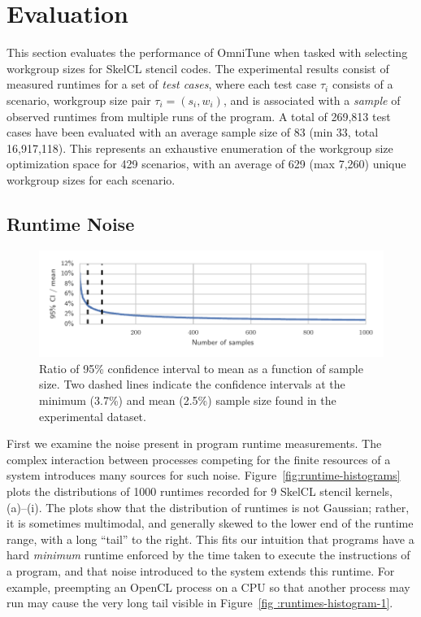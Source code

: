 \documentclass[nonatbib,preprint,nocopyrightspace,9pt]{sigplanconf}
\begin{document}
  \section{Evaluation}\label{sec:evaluation}

  This section evaluates the performance of OmniTune when tasked with selecting
  workgroup sizes for SkelCL stencil codes. The experimental results consist of
  measured runtimes for a set of \emph{test cases}, where each test case $\tau_i$
  consists of a scenario, workgroup size pair $\tau_i = (s_i,w_i)$, and is
  associated with a \emph{sample} of observed runtimes from multiple runs of the
  program. A total of 269,813 test cases have been evaluated with an average
  sample size of 83 (min 33, total 16,917,118). This represents an exhaustive
  enumeration of the workgroup size optimization space for 429 scenarios, with an
  average of 629 (max 7,260) unique workgroup sizes for each scenario.


  \subsection{Runtime Noise}

  \begin{figure}
    \centering
    \includegraphics[width=\columnwidth]{img/ci_trend}
    \caption{%
    Ratio of 95\% confidence interval to mean as a function of sample size. Two
    dashed lines indicate the confidence intervals at the minimum (3.7\%) and mean
    (2.5\%) sample size found in the experimental dataset.%
    }
    \label{fig:ci-trends}
  \end{figure}

  First we examine the noise present in program runtime measurements. The complex
  interaction between processes competing for the finite resources of a system
  introduces many sources for such noise. Figure~\ref{fig:runtime-histograms}
  plots the distributions of 1000 runtimes recorded for 9 SkelCL stencil kernels,
  (a)--(i). The plots show that the distribution of runtimes is not Gaussian;
  rather, it is sometimes multimodal, and generally skewed to the lower end of the
  runtime range, with a long ``tail'' to the right. This fits our intuition that
  programs have a hard \emph{minimum} runtime enforced by the time taken to
  execute the instructions of a program, and that noise introduced to the system
  extends this runtime. For example, preempting an OpenCL process on a CPU so that
  another process may run may cause the very long tail visible in Figure~\ref{fig
  :runtimes-histogram-1}.
\end{document}
